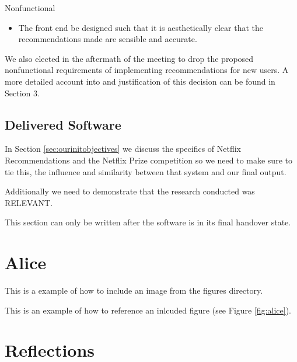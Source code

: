 \documentclass{l3proj}
\begin{document}
Nonfunctional
\begin{itemize}
\item The front end be designed such that it is aesthetically clear that the recommendations made are sensible and accurate.
\end{itemize}

We also elected in the aftermath of the meeting to drop the proposed nonfunctional requirements of implementing recommendations for new users. A more detailed account into and justification of this decision can be found in Section 3.

\subsection{Delivered Software}
\label{sec:finsoftware}

In Section \ref{sec:ourinitobjectives} we discuss the specifics of Netflix Recommendations and the Netflix Prize competition so we need to make sure to tie this, the influence and similarity between that system and our final output. 

Additionally we need to demonstrate that the research conducted was RELEVANT.

This section can only be written after the software is in its final handover state.
\newpage


\section{Alice}
\label{sec:alice}

This is a example of how to include an image from the figures directory.



This is an example of how to reference an inlcuded figure (see Figure \ref{fig:alice}).


\section{Reflections}
\label{sec:reflections}
\end{document}
